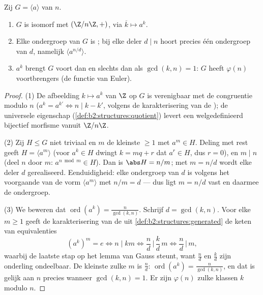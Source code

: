 \begin{proposition}\label{prop:b2:structures:cyclic}
Zij $G = \langle a \rangle$  van  $n$.
\begin{enumerate}
  \item $G$ is isomorf met $(\Z/n\Z, +)$, via $\overline k \mapsto
        a^k$.
  \item Elke ondergroep van $G$ is ; bij elke deler $d
        \mid n$ hoort precies één ondergroep van  $d$, namelijk
        $\langle a^{n/d}\rangle$.
  \item $a^k$ brengt $G$ voort dan en slechts dan als $\gcd(k, n)
        = 1$: $G$ heeft $\varphi(n)$ voortbrengers (de functie van
        Euler).
\end{enumerate}
\end{proposition}

\begin{proof}
(1) De afbeelding $k \mapsto a^k$ van $\Z$ op $G$ is verenigbaar
met de congruentie modulo $n$ ($a^{k} = a^{k'} \iff n \mid k -
k'$, volgens de karakterisering van de ); de universele
eigenschap (\cref{def:b2:structures:quotient}) levert een
welgedefinieerd bijectief morfisme vanuit $\Z/n\Z$.

(2) Zij $H \leq G$ niet triviaal en $m$ de kleinste $\geq 1$ met
$a^m \in H$. Deling met rest geeft $H = \langle a^m\rangle$ (voor
$a^k \in H$ dwingt $k = mq + r$ dat $a^r \in H$, dus $r = 0$), en
$m \mid n$ (deel $n$ door $m$: $a^{n \bmod m} \in H$). Dan is
$\abs H = n/m$; met $m = n/d$ wordt elke deler $d$ gerealiseerd.
Eenduidigheid: elke ondergroep van  $d$ is volgens het
voorgaande van de vorm $\langle a^m \rangle$ met $n/m = d$ ---
dus ligt $m = n/d$ vast en daarmee de ondergroep.

(3) We beweren dat $\operatorname{ord}(a^k) = \frac{n}{\gcd(k,
n)}$. Schrijf $d = \gcd(k, n)$. Voor elke $m \geq 1$ geeft de
karakterisering van de  uit \cref{def:b2:structures:generated}
de keten van equivalenties
\[
(a^k)^m = e
\iff n \mid km
\iff \frac{n}{d} \,\Big|\, \frac{k}{d}\,m
\iff \frac{n}{d} \,\Big|\, m ,
\]
waarbij de laatste stap op het lemma van Gauss steunt, want
$\frac nd$ en $\frac kd$ zijn onderling ondeelbaar. De kleinste
zulke $m$ is $\frac nd$: $\operatorname{ord}(a^k) = \frac
n{\gcd(k,n)}$, en dat is gelijk aan $n$ precies wanneer $\gcd(k,
n) = 1$. Er zijn $\varphi(n)$ zulke klassen $k$ modulo $n$.
\end{proof}

